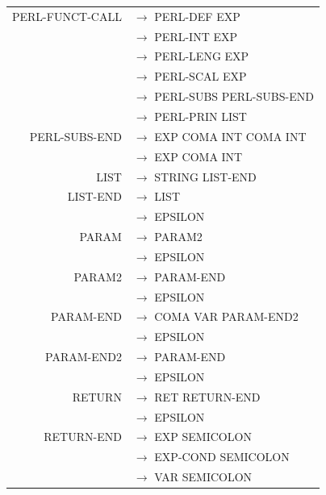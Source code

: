 \documentclass[a4paper,10pt]{article}
\begin{document}
\begin{tabular}{rl}
				
PERL-FUNCT-CALL		& $\rightarrow$ PERL-DEF EXP \\
					& $\rightarrow$ PERL-INT EXP \\
					& $\rightarrow$ PERL-LENG EXP \\ 
					& $\rightarrow$ PERL-SCAL EXP \\
					& $\rightarrow$ PERL-SUBS PERL-SUBS-END \\
					& $\rightarrow$ PERL-PRIN LIST \\ 
					
PERL-SUBS-END		& $\rightarrow$ EXP COMA INT COMA INT \\
					& $\rightarrow$ EXP COMA INT  \\
					
LIST				& $\rightarrow$ STRING LIST-END\\
					
LIST-END			& $\rightarrow$ LIST\\
					& $\rightarrow$ EPSILON\\
				

					
PARAM				& $\rightarrow$ PARAM2\\
					& $\rightarrow$ EPSILON \\

PARAM2				& $\rightarrow$ PARAM-END\\
					& $\rightarrow$ EPSILON \\
					
					
PARAM-END			& $\rightarrow$ COMA VAR PARAM-END2\\ 
					& $\rightarrow$ EPSILON \\
					
PARAM-END2			& $\rightarrow$ PARAM-END\\ 
					& $\rightarrow$ EPSILON \\

RETURN				& $\rightarrow$ RET RETURN-END\\
					& $\rightarrow$ EPSILON \\

RETURN-END			& $\rightarrow$ EXP SEMICOLON\\
					& $\rightarrow$ EXP-COND SEMICOLON\\
					& $\rightarrow$ VAR SEMICOLON\\
					
\end{tabular}
\end{document}
